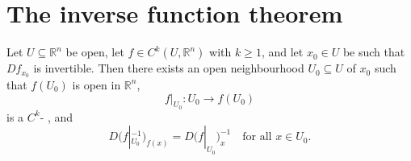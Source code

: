 
\section{The inverse function theorem}
\label{sec:inverse_function_theorem}

\begin{theorem}
\label{thm:inverse_function_theorem}
Let $U \subseteq \mathbb{R}^n$ be open, let $f \in C^k(U,\mathbb{R}^n)$ with $k \geq 1$, and let
$x_0 \in U$ be such that $Df_{x_0}$ is invertible. Then there exists an open neighbourhood
$U_0 \subseteq U$ of $x_0$ such that $f(U_0)$ is open in $\mathbb{R}^n$,
\[f|_{U_0} : U_0 \to f(U_0)\]
is a $C^k$- , and
\[D\big(f|_{U_0}^{-1}\big)_{f(x)} = D\big(f|_{U_0}\big)_x^{-1} \quad \text{for all } x \in U_0.\]
\end{theorem}

